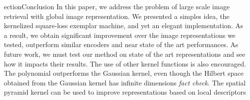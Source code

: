 ection{Conclusion}
\label{conclusion}
In this paper, we address the problem of large scale image retrieval with global image representation. 
We presented a simples idea, the kernelized square-loss exemplar machine, and yet an elegant implementation. 
As a result, we obtain significant improvement over the image representations we tested, outperform similar encoders and near state of the art performances.
As future work, we must test our method on state of the art representations and see how it impacts their results.
The use of other kernel functions is also encouraged. The polynomial outperforms the Gaussian kernel, even though the Hilbert space obtained from the Gaussian kernel has infinite dimensions \emph{\color{red} fact check}. 
The spatial pyramid kernel can be used to improve representations based on local descriptors
